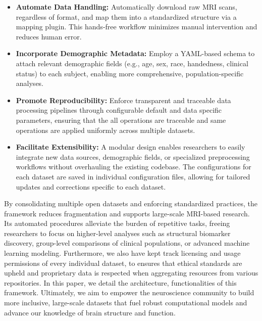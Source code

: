 \begin{itemize}
    
    \item \textbf{Automate Data Handling:} 
    Automatically download raw MRI scans, regardless of format, and map them into a standardized structure via a mapping plugin. 
    This hands-free workflow minimizes manual intervention and reduces human error.

    \item \textbf{Incorporate Demographic Metadata:}
    Employ a YAML-based schema to attach relevant demographic fields (e.g., age, sex, race, handedness, clinical status) to each subject, 
    enabling more comprehensive, population-specific analyses.

    \item \textbf{Promote Reproducibility:}
    Enforce transparent and traceable data processing pipelines through configurable default and data specific parameters, ensuring 
    that the all operations are traceable and same operations are applied uniformly across multiple datasets.

    \item \textbf{Facilitate Extensibility:}
    A modular design enables researchers to easily integrate new data sources, demographic fields, or specialized preprocessing workflows 
    without overhauling the existing codebase. The configurations for each dataset are saved in individual configuration files, allowing 
    for tailored updates and corrections specific to each dataset.

\end{itemize}




By consolidating multiple open datasets and enforcing standardized practices, the framework 
reduces fragmentation and supports large-scale MRI-based research. Its automated procedures 
alleviate the burden of repetitive tasks, freeing researchers to focus on higher-level analyses 
such as structural biomarker discovery, group-level comparisons of clinical populations, 
or advanced machine learning modeling.
Furthermore, we also have kept track licensing and usage permissions of every individual dataset, 
to ensures that ethical standards are upheld and proprietary data is respected when aggregating 
resources from various repositories.
In this paper, we detail the architecture, functionalities of this framework.
Ultimately, we aim to empower the neuroscience community to build more inclusive, large-scale datasets 
that fuel robust computational models and advance our knowledge of brain structure and function.


